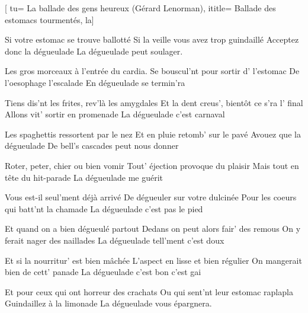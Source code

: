  [
tu= {La ballade des gens heureux (Gérard Lenorman)},
ititle= {Ballade des estomacs tourmentés, la}]


\beginverse
Si votre estomac se trouve ballotté
Si la veille vous avez trop guindaillé
Acceptez donc la dégueulade
La dégueulade peut soulager.
\endverse

\beginverse
Les gros morceaux à l'entrée du cardia.
Se bouscul'nt pour sortir d' l'estomac
De l'oesophage l'escalade
En dégueulade se termin'ra
\endverse

\beginverse
Tiens dis'nt les frites, rev'là les amygdales
Et la dent creus', bientôt ce s'ra l' final
Allons vit' sortir en promenade
La dégueulade c'est carnaval
\endverse

\beginverse
Les spaghettis ressortent par le nez
Et en pluie retomb' sur le pavé
Avouez que la dégueulade
De bell's cascades peut nous donner
\endverse

\beginverse
Roter, peter, chier ou bien vomir
Tout' éjection provoque du plaisir
Mais tout en tête du hit-parade
La dégueulade me guérit
\endverse

\beginverse
Vous est-il seul'ment déjà arrivé
De dégueuler sur votre dulcinée
Pour les coeurs qui batt'nt la chamade
La dégueulade c'est pas le pied
\endverse

\beginverse
Et quand on a bien dégueulé partout
Dedans on peut alors fair' des remous
On y ferait nager des naillades
La dégueulade tell'ment c'est doux
\endverse

\beginverse
Et si la nourritur' est bien mâchée
L'aspect en lisse et bien régulier
On mangerait bien de cett' panade
La dégueulade c'est bon c'est gai
\endverse

\beginverse
Et pour ceux qui ont horreur des crachats
Ou qui sent'nt leur estomac raplapla
Guindaillez à la limonade
La dégueulade vous épargnera.
\endverse

\endsong